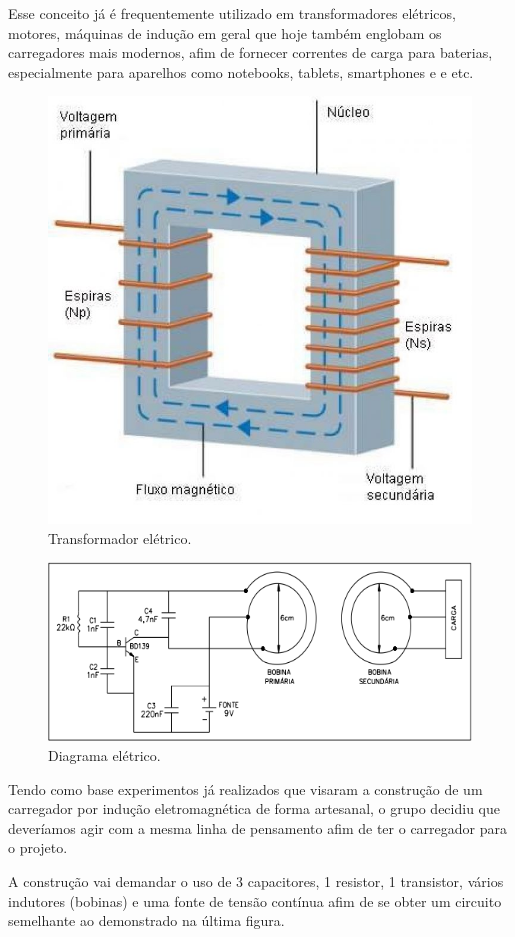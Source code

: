 Esse conceito já é frequentemente utilizado em transformadores elétricos, motores, máquinas de indução em geral que hoje também englobam os carregadores mais modernos, afim de fornecer correntes de carga para baterias, especialmente para aparelhos como notebooks, tablets, smartphones e  e etc.

 \begin{figure}[H]
	\centering
	\includegraphics[scale=0.5]{figuras/transformador}
	\caption{Transformador elétrico.}
	\label{img:transformador}
\end{figure}

 \begin{figure}[H]
	\centering
	\includegraphics[scale=0.5]{figuras/diagrama_eletrico}
	\caption{Diagrama elétrico.}
	\label{img:diagrama_eletrico}
\end{figure}

Tendo como base experimentos já realizados que visaram a construção de um carregador por indução eletromagnética de forma artesanal, o grupo decidiu que deveríamos agir com a mesma linha de pensamento afim de ter o carregador para o projeto.

A construção vai demandar o uso de 3 capacitores, 1 resistor, 1 transistor, vários indutores (bobinas) e uma fonte de tensão contínua afim de se obter um circuito semelhante ao demonstrado na última figura.


